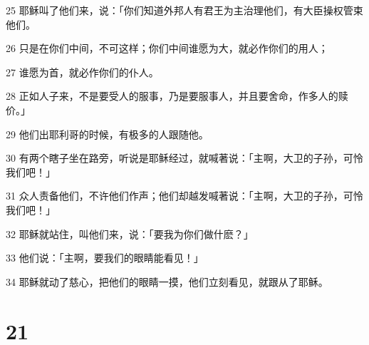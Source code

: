 \par 25 耶稣叫了他们来，说：「你们知道外邦人有君王为主治理他们，有大臣操权管束他们。
\par 26 只是在你们中间，不可这样；你们中间谁愿为大，就必作你们的用人；
\par 27 谁愿为首，就必作你们的仆人。
\par 28 正如人子来，不是要受人的服事，乃是要服事人，并且要舍命，作多人的赎价。」
\par 29 他们出耶利哥的时候，有极多的人跟随他。
\par 30 有两个瞎子坐在路旁，听说是耶稣经过，就喊著说：「主啊，大卫的子孙，可怜我们吧！」
\par 31 众人责备他们，不许他们作声；他们却越发喊著说：「主啊，大卫的子孙，可怜我们吧！」
\par 32 耶稣就站住，叫他们来，说：「要我为你们做什麽？」
\par 33 他们说：「主啊，要我们的眼睛能看见！」
\par 34 耶稣就动了慈心，把他们的眼睛一摸，他们立刻看见，就跟从了耶稣。

\chapter{21}

